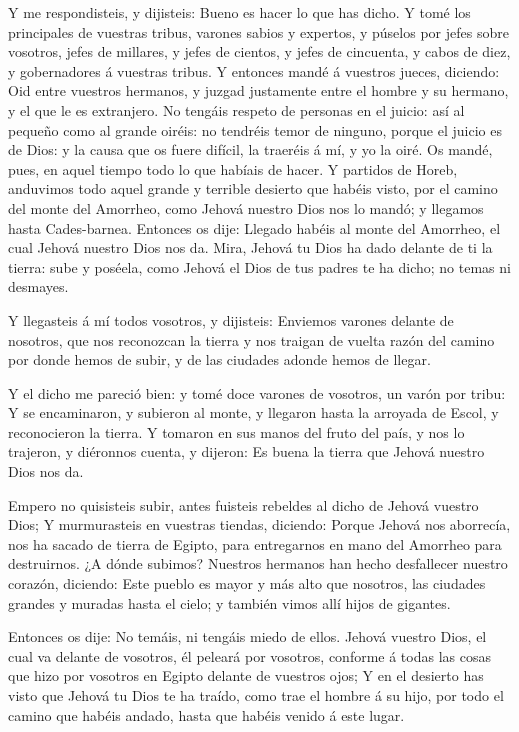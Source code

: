  Y me respondisteis, y dijisteis: Bueno es hacer lo que has
dicho.  Y tomé los principales de vuestras tribus, varones
sabios y expertos, y púselos por jefes sobre vosotros, jefes de
millares, y jefes de cientos, y jefes de cincuenta, y cabos de diez, y
gobernadores á vuestras tribus.  Y entonces mandé á
vuestros jueces, diciendo: Oid entre vuestros hermanos, y juzgad
justamente entre el hombre y su hermano, y el que le es extranjero.
 No tengáis respeto de personas en el juicio: así al
pequeño como al grande oiréis: no tendréis temor de ninguno, porque el
juicio es de Dios: y la causa que os fuere difícil, la traeréis á mí, y
yo la oiré.  Os mandé, pues, en aquel tiempo todo lo que
habíais de hacer.  Y partidos de Horeb, anduvimos todo
aquel grande y terrible desierto que habéis visto, por el camino del
monte del Amorrheo, como Jehová nuestro Dios nos lo mandó; y llegamos
hasta Cades-barnea.  Entonces os dije: Llegado habéis al
monte del Amorrheo, el cual Jehová nuestro Dios nos da. 
Mira, Jehová tu Dios ha dado delante de ti la tierra: sube y poséela,
como Jehová el Dios de tus padres te ha dicho; no temas ni desmayes.

 Y llegasteis á mí todos vosotros, y dijisteis: Enviemos
varones delante de nosotros, que nos reconozcan la tierra y nos traigan
de vuelta razón del camino por donde hemos de subir, y de las ciudades
adonde hemos de llegar.

 Y el dicho me pareció bien: y tomé doce varones de
vosotros, un varón por tribu:  Y se encaminaron, y subieron
al monte, y llegaron hasta la arroyada de Escol, y reconocieron la
tierra.  Y tomaron en sus manos del fruto del país, y nos
lo trajeron, y diéronnos cuenta, y dijeron: Es buena la tierra que
Jehová nuestro Dios nos da.

 Empero no quisisteis subir, antes fuisteis rebeldes al
dicho de Jehová vuestro Dios;  Y murmurasteis en vuestras
tiendas, diciendo: Porque Jehová nos aborrecía, nos ha sacado de tierra
de Egipto, para entregarnos en mano del Amorrheo para destruirnos.
 ¿A dónde subimos? Nuestros hermanos han hecho desfallecer
nuestro corazón, diciendo: Este pueblo es mayor y más alto que nosotros,
las ciudades grandes y muradas hasta el cielo; y también vimos allí
hijos de gigantes.

 Entonces os dije: No temáis, ni tengáis miedo de ellos.
 Jehová vuestro Dios, el cual va delante de vosotros, él
peleará por vosotros, conforme á todas las cosas que hizo por vosotros
en Egipto delante de vuestros ojos;  Y en el desierto has
visto que Jehová tu Dios te ha traído, como trae el hombre á su hijo,
por todo el camino que habéis andado, hasta que habéis venido á este
lugar.

